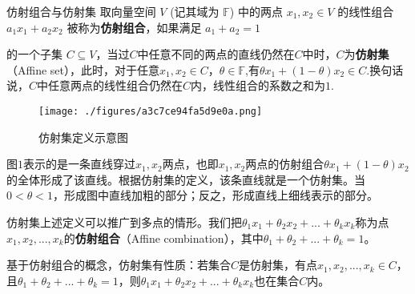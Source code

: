 
\begin{issues}
\issueDraft
\end{issues}


\begin{definition}{仿射组合与仿射集}
取向量空间 $V$ (记其域为 $\mathbb{F}$) 中的两点 $x_1, x_2 \in V$ 的线性组合 $a_1 x_1 + a_2 x_2$ 被称为\textbf{仿射组合}，如果满足 $a_1 + a_2 = 1$



的一个子集 $C \subseteq V$，当过$C$中任意不同的两点的直线仍然在$C$中时，$C$为\textbf{仿射集}（Affine set），此时，对于任意$x_1,x_2 \in C$，$\theta \in \mathbb{F}$,有$\theta x_1+(1-\theta)x_2 \in C$.换句话说，$C$中任意两点的线性组合仍然在$C$内，线性组合的系数之和为$1$.

\end{definition}

\begin{figure}[ht]
\centering
\texttt{[image: ./figures/a3c7ce94fa5d9e0a.png]}
\caption{仿射集定义示意图} \label{fig_AffSet_1}
\end{figure}

图$1$表示的是一条直线穿过$x_1,x_2$两点，也即$x_1,x_2$两点的仿射组合$\theta x_1+(1-\theta)x_2$的全体形成了该直线。根据仿射集的定义，该条直线就是一个仿射集。当$0<\theta<1$，形成图中直线加粗的部分；反之，形成直线上细线表示的部分。

仿射集上述定义可以推广到多点的情形。我们把$\theta_1x_1+\theta_2x_2+...+\theta_kx_k$称为点$x_1,x_2,...,x_k$的\textbf{仿射组合}（Affine combination），其中$\theta_1+\theta_2+...+\theta_k=1$。

基于仿射组合的概念，仿射集有性质：若集合$C$是仿射集，有点$x_1,x_2,...,x_k \in C$，且$\theta_1+\theta_2+...+\theta_k=1$，则$\theta_1x_1+\theta_2x_2+...+\theta_kx_k$也在集合$C$内。
